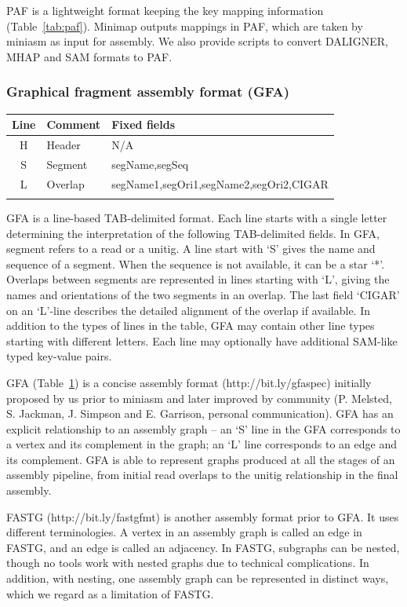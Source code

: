 \documentclass{bioinfo}
\begin{document}
\begin{methods}
PAF is a lightweight format keeping the key mapping information (Table~\ref{tab:paf}).
Minimap outputs mappings in PAF, which are taken by miniasm as input for
assembly. We also provide scripts to convert DALIGNER, MHAP and SAM formats to
PAF.

\subsubsection{Graphical fragment assembly format (GFA)}

\begin{table}[tb]
{\footnotesize\label{tab:gfa}
\begin{tabular}{clp{5.8cm}}
\toprule
Line & Comment & Fixed fields \\
\midrule
H    & Header  & N/A \\
S    & Segment & segName,segSeq \\
L    & Overlap & segName1,segOri1,segName2,segOri2,CIGAR \\
\botrule
\end{tabular}
}{GFA is a line-based TAB-delimited format. Each line starts with a single
letter determining the interpretation of the following TAB-delimited fields. In
GFA, segment refers to a read or a unitig. A line start with `S' gives the name
and sequence of a segment. When the sequence is not available, it can be a star
`*'. Overlaps between segments are represented in lines starting with `L',
giving the names and orientations of the two segments in an overlap. The last
field `CIGAR' on an `L'-line describes the detailed alignment of the overlap if
available. In addition to the types of lines in the table, GFA may contain
other line types starting with different letters. Each line may optionally have
additional SAM-like typed key-value pairs.}
\end{table}

GFA (Table~\ref{tab:gfa}) is a concise assembly format (http://bit.ly/gfaspec) initially proposed by
us prior to miniasm and later improved by community (P. Melsted, S.  Jackman,
J. Simpson and E. Garrison, personal communication). GFA has an explicit
relationship to an assembly graph -- an `S' line in the GFA corresponds to a
vertex and its complement in the graph; an `L' line corresponds to an edge and
its complement. GFA is able to represent graphs produced at all the stages of
an assembly pipeline, from initial read overlaps to the unitig relationship in
the final assembly.

FASTG (http://bit.ly/fastgfmt) is another assembly format prior to GFA.
It uses different terminologies. A vertex in an assembly graph is called an
edge in FASTG, and an edge is called an adjacency. In FASTG, subgraphs can be
nested, though no tools work with nested graphs due to technical complications.
In addition, with nesting, one assembly graph can be represented in distinct
ways, which we regard as a limitation of FASTG.

\end{methods}
\end{document}
